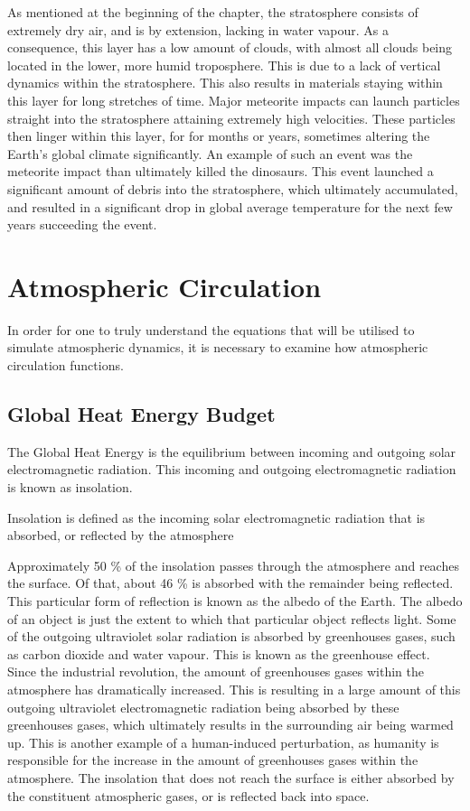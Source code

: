 As mentioned at the beginning of the chapter, the stratosphere consists of extremely dry air, and is by extension, lacking in water vapour. As a consequence, this layer has a low amount of clouds, with almost all clouds being located in the lower, more humid troposphere. This is due to a lack of vertical dynamics within the stratosphere. This also results in materials staying within this layer for long stretches of time. Major meteorite impacts can launch particles straight into the stratosphere attaining extremely high velocities. These particles then linger within this layer, for for months or years, sometimes altering the Earth's global climate significantly\cite{stratosphere}. An example of such an event was the meteorite impact than ultimately killed the dinosaurs. This event launched a significant amount of debris into the stratosphere, which ultimately accumulated, and resulted in a significant drop in global average temperature for the next few years succeeding the event. 

\section{Atmospheric Circulation}
In order for one to truly understand the equations that will be utilised to simulate atmospheric dynamics, it is necessary to examine how atmospheric circulation functions. 

\subsection{Global Heat Energy Budget}
The Global Heat Energy is the equilibrium between incoming and outgoing solar electromagnetic radiation. This incoming and outgoing electromagnetic radiation is known as insolation. 

\begin{definition}
Insolation is defined as the incoming solar electromagnetic radiation that is absorbed, or reflected by the atmosphere
\end{definition}

Approximately 50 \% of the insolation passes through the atmosphere and reaches the surface. Of that, about 46 \% is absorbed with the remainder being reflected. This particular form of reflection is known as the albedo of the Earth. The albedo of an object is just the extent to which that particular object reflects light. Some of the outgoing ultraviolet solar radiation is absorbed by greenhouses gases, such as carbon dioxide and water vapour. This is known as the greenhouse effect. Since the industrial revolution, the amount of greenhouses gases within the atmosphere has dramatically increased. This is resulting in a large amount of this outgoing ultraviolet electromagnetic radiation being absorbed by these greenhouses gases, which ultimately results in the surrounding air being warmed up. This is another example of a human-induced perturbation, as humanity is responsible for the increase in the amount of greenhouses gases within the atmosphere. The insolation that does not reach the surface is either absorbed by the constituent atmospheric gases, or is reflected back into space\cite{insolation}.

